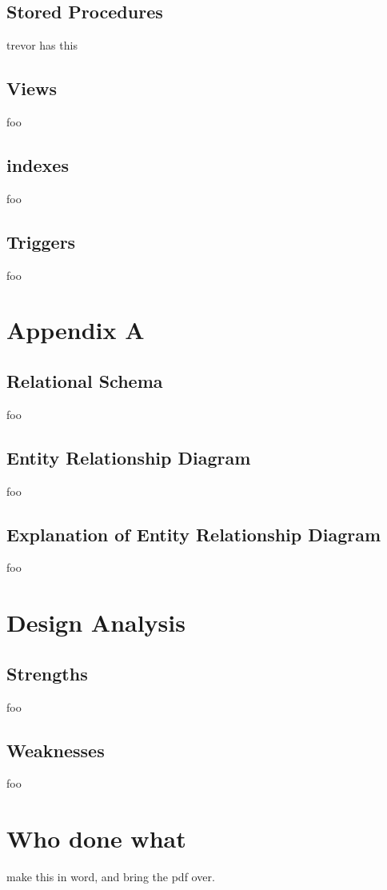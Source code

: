 \documentclass{article}
\begin{document}
\subsection{Stored Procedures}
trevor has this
\subsection{Views}
foo
\subsection{indexes}
foo
\subsection{Triggers}
foo

\section{Appendix A}
\subsection{Relational Schema}
foo
\subsection{Entity Relationship Diagram}
foo
\subsection{Explanation of Entity Relationship Diagram}
foo

\section{Design Analysis}
\subsection{Strengths}
foo
\subsection{Weaknesses}
foo

\section{Who done what}
make this in word, and bring the pdf over.
\end{document}
